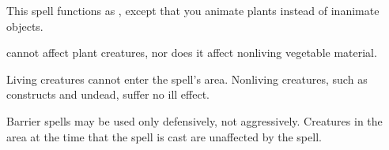 \begin{spelleffect}
  This spell functions as , except that you animate plants instead of inanimate objects.
\end{spelleffect}
\begin{spellnotes}
   cannot affect plant creatures, nor does it affect nonliving vegetable material.
\end{spellnotes}

\begin{spelleffect}
  Living creatures cannot enter the spell's area. Nonliving creatures, such as constructs and undead, suffer no ill effect.
\end{spelleffect}
\begin{spellnotes}
  Barrier spells may be used only defensively, not aggressively. Creatures in the area at the time that the spell is cast are unaffected by the spell.
\end{spellnotes}

